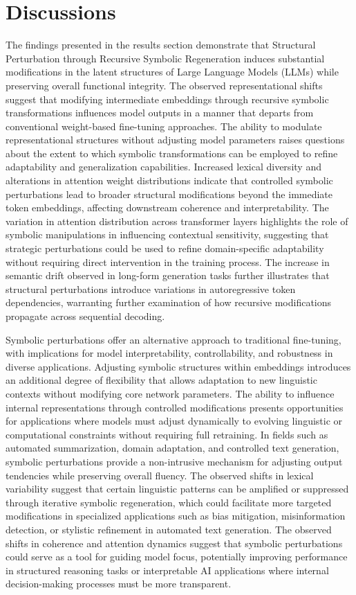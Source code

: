 \documentclass[5p,times]{elsarticle}
\begin{document}
\section{Discussions}

The findings presented in the results section demonstrate that Structural Perturbation through Recursive Symbolic Regeneration induces substantial modifications in the latent structures of Large Language Models (LLMs) while preserving overall functional integrity. The observed representational shifts suggest that modifying intermediate embeddings through recursive symbolic transformations influences model outputs in a manner that departs from conventional weight-based fine-tuning approaches. The ability to modulate representational structures without adjusting model parameters raises questions about the extent to which symbolic transformations can be employed to refine adaptability and generalization capabilities. Increased lexical diversity and alterations in attention weight distributions indicate that controlled symbolic perturbations lead to broader structural modifications beyond the immediate token embeddings, affecting downstream coherence and interpretability. The variation in attention distribution across transformer layers highlights the role of symbolic manipulations in influencing contextual sensitivity, suggesting that strategic perturbations could be used to refine domain-specific adaptability without requiring direct intervention in the training process. The increase in semantic drift observed in long-form generation tasks further illustrates that structural perturbations introduce variations in autoregressive token dependencies, warranting further examination of how recursive modifications propagate across sequential decoding.

Symbolic perturbations offer an alternative approach to traditional fine-tuning, with implications for model interpretability, controllability, and robustness in diverse applications. Adjusting symbolic structures within embeddings introduces an additional degree of flexibility that allows adaptation to new linguistic contexts without modifying core network parameters. The ability to influence internal representations through controlled modifications presents opportunities for applications where models must adjust dynamically to evolving linguistic or computational constraints without requiring full retraining. In fields such as automated summarization, domain adaptation, and controlled text generation, symbolic perturbations provide a non-intrusive mechanism for adjusting output tendencies while preserving overall fluency. The observed shifts in lexical variability suggest that certain linguistic patterns can be amplified or suppressed through iterative symbolic regeneration, which could facilitate more targeted modifications in specialized applications such as bias mitigation, misinformation detection, or stylistic refinement in automated text generation. The observed shifts in coherence and attention dynamics suggest that symbolic perturbations could serve as a tool for guiding model focus, potentially improving performance in structured reasoning tasks or interpretable AI applications where internal decision-making processes must be more transparent.
\end{document}
